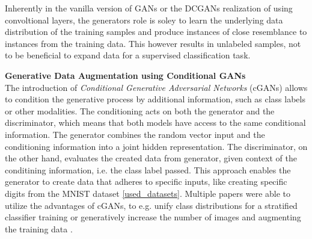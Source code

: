 Inherently in the vanilla version of GANs or the DCGANs realization of using convoltional layers, the generators role is soley to learn the underlying data distribution of the training samples and produce instances of close resemblance to instances from the training data. This however results in unlabeled samples, not to be beneficial to expand data for a supervised classification task.

\noindent\textbf{Generative Data Augmentation using Conditional GANs}\label{cgans_data_augmentation} \\
The introduction of \textit{Conditional Generative Adversarial Networks} (cGANs) \cite{mirza2014conditionalgenerativeadversarialnets} allows to condition the generative process by additional information, such as class labels or other modalities. The conditioning acts on both the generator and the discriminator, which means that both models have access to the same conditional information. The generator combines the random vector input and the conditioning information into a joint hidden representation. The discriminator, on the other hand, evaluates the created data from generator, given context of the conditining information, i.e. the class label passed. This approach enables the generator to create data that adheres to specific inputs, like creating specific digits from the MNIST dataset \ref{used_datasets}. Multiple papers were able to utilize the advantages of cGANs, to e.g. unify class distributions for a stratified classifier training or generatively increase the number of images and augmenting the training data
\cite{jeong2022gan}
\cite{zhao2023gan}
\cite{cGANGDA2025asurveyreview}
\cite{wickramaratne2021conditional}
.










\newpage
